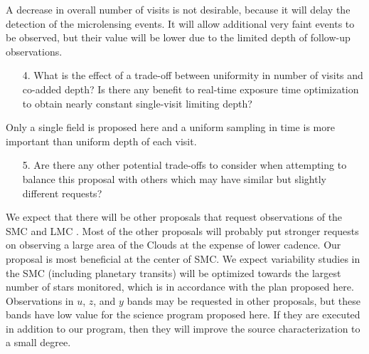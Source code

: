 \documentclass[12pt,letterpaper]{article}
\begin{document}
A decrease in overall number of visits is not desirable, because it will delay 
the detection of the microlensing events.  It will allow additional very faint 
events to be observed, but their value will be lower due to the limited depth of 
follow-up observations. 

\begin{footnotesize}
\begin{enumerate}
    \item[4.] What is the effect of a trade-off between uniformity in number of visits and co-added depth? Is there any benefit to real-time exposure time optimization to obtain nearly constant single-visit limiting depth?
\end{enumerate}
\end{footnotesize}

Only a single field is proposed here and a uniform sampling in time is more 
important than uniform depth of each visit.

\begin{footnotesize}
\begin{enumerate}
    \item[5.] Are there any other potential trade-offs to consider when attempting to balance this proposal with others which may have similar but slightly different requests?
\end{enumerate}
\end{footnotesize}

We expect that there will be other proposals that request observations of the SMC and LMC 
\citep[see Sec.\, 7 in][]{marshall17}.  Most of the other proposals will probably 
put stronger requests on observing a large area of the Clouds at the expense of lower cadence.  
Our proposal is most beneficial at the center of SMC.  We expect variability 
studies in the SMC (including planetary transits) will be optimized towards 
the largest number of stars monitored, which is in accordance with the plan 
proposed here. Observations in $u$, $z$, and $y$ bands may be requested 
in other proposals, but these bands have low value for the science program 
proposed here.  If they are executed in addition to our program, then they 
will improve the source characterization to a small degree. 
\end{document}
